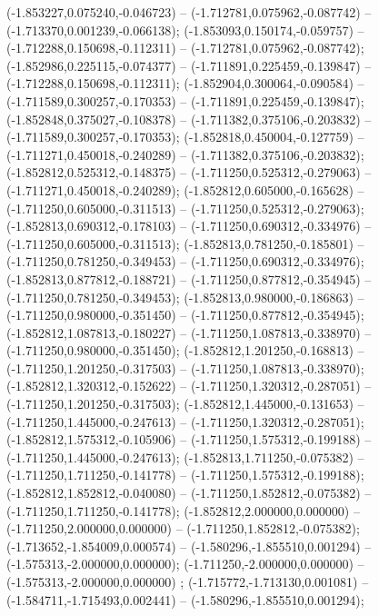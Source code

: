  (-1.853227,0.075240,-0.046723) -- (-1.712781,0.075962,-0.087742) -- (-1.713370,0.001239,-0.066138);
 (-1.853093,0.150174,-0.059757) -- (-1.712288,0.150698,-0.112311) -- (-1.712781,0.075962,-0.087742);
 (-1.852986,0.225115,-0.074377) -- (-1.711891,0.225459,-0.139847) -- (-1.712288,0.150698,-0.112311);
 (-1.852904,0.300064,-0.090584) -- (-1.711589,0.300257,-0.170353) -- (-1.711891,0.225459,-0.139847);
 (-1.852848,0.375027,-0.108378) -- (-1.711382,0.375106,-0.203832) -- (-1.711589,0.300257,-0.170353);
 (-1.852818,0.450004,-0.127759) -- (-1.711271,0.450018,-0.240289) -- (-1.711382,0.375106,-0.203832);
 (-1.852812,0.525312,-0.148375) -- (-1.711250,0.525312,-0.279063) -- (-1.711271,0.450018,-0.240289);
 (-1.852812,0.605000,-0.165628) -- (-1.711250,0.605000,-0.311513) -- (-1.711250,0.525312,-0.279063);
 (-1.852813,0.690312,-0.178103) -- (-1.711250,0.690312,-0.334976) -- (-1.711250,0.605000,-0.311513);
 (-1.852813,0.781250,-0.185801) -- (-1.711250,0.781250,-0.349453) -- (-1.711250,0.690312,-0.334976);
 (-1.852813,0.877812,-0.188721) -- (-1.711250,0.877812,-0.354945) -- (-1.711250,0.781250,-0.349453);
 (-1.852813,0.980000,-0.186863) -- (-1.711250,0.980000,-0.351450) -- (-1.711250,0.877812,-0.354945);
 (-1.852812,1.087813,-0.180227) -- (-1.711250,1.087813,-0.338970) -- (-1.711250,0.980000,-0.351450);
 (-1.852812,1.201250,-0.168813) -- (-1.711250,1.201250,-0.317503) -- (-1.711250,1.087813,-0.338970);
 (-1.852812,1.320312,-0.152622) -- (-1.711250,1.320312,-0.287051) -- (-1.711250,1.201250,-0.317503);
 (-1.852812,1.445000,-0.131653) -- (-1.711250,1.445000,-0.247613) -- (-1.711250,1.320312,-0.287051);
 (-1.852812,1.575312,-0.105906) -- (-1.711250,1.575312,-0.199188) -- (-1.711250,1.445000,-0.247613);
 (-1.852813,1.711250,-0.075382) -- (-1.711250,1.711250,-0.141778) -- (-1.711250,1.575312,-0.199188);
 (-1.852812,1.852812,-0.040080) -- (-1.711250,1.852812,-0.075382) -- (-1.711250,1.711250,-0.141778);
 (-1.852812,2.000000,0.000000) -- (-1.711250,2.000000,0.000000) -- (-1.711250,1.852812,-0.075382);
 (-1.713652,-1.854009,0.000574) -- (-1.580296,-1.855510,0.001294) -- (-1.575313,-2.000000,0.000000);
 (-1.711250,-2.000000,0.000000) -- (-1.575313,-2.000000,0.000000) ;
 (-1.715772,-1.713130,0.001081) -- (-1.584711,-1.715493,0.002441) -- (-1.580296,-1.855510,0.001294);
